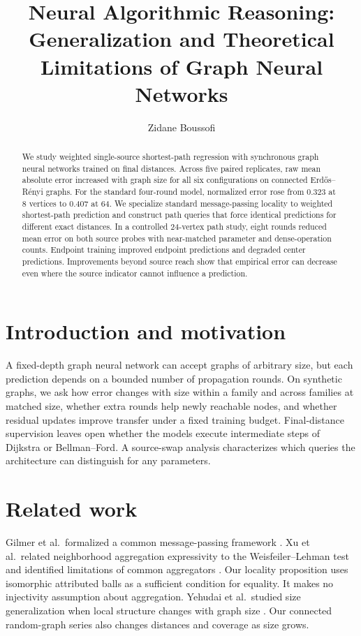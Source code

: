 \documentclass[11pt]{article}
\title{Neural Algorithmic Reasoning:\\ Generalization and Theoretical Limitations of Graph Neural Networks}
\author{Zidane Boussofi}
\date{}
\begin{document}
\maketitle
\begin{abstract}
We study weighted single-source shortest-path regression with synchronous graph neural networks trained on final distances. Across five paired replicates, raw mean absolute error increased with graph size for all six configurations on connected Erd\H{o}s--R\'enyi graphs. For the standard four-round model, normalized error rose from 0.323 at 8 vertices to 0.407 at 64. We specialize standard message-passing locality to weighted shortest-path prediction and construct path queries that force identical predictions for different exact distances. In a controlled 24-vertex path study, eight rounds reduced mean error on both source probes with near-matched parameter and dense-operation counts. Endpoint training improved endpoint predictions and degraded center predictions. Improvements beyond source reach show that empirical error can decrease even where the source indicator cannot influence a prediction.
\end{abstract}

\section{Introduction and motivation}
A fixed-depth graph neural network can accept graphs of arbitrary size, but each prediction depends on a bounded number of propagation rounds. On synthetic graphs, we ask how error changes with size within a family and across families at matched size, whether extra rounds help newly reachable nodes, and whether residual updates improve transfer under a fixed training budget. Final-distance supervision leaves open whether the models execute intermediate steps of Dijkstra or Bellman--Ford. A source-swap analysis characterizes which queries the architecture can distinguish for any parameters.

\section{Related work}
Gilmer et al.\ formalized a common message-passing framework \cite{gilmer}. Xu et al.\ related neighborhood aggregation expressivity to the Weisfeiler--Lehman test and identified limitations of common aggregators \cite{xu}. Our locality proposition uses isomorphic attributed balls as a sufficient condition for equality. It makes no injectivity assumption about aggregation. Yehudai et al.\ studied size generalization when local structure changes with graph size \cite{yehudai}. Our connected random-graph series also changes distances and coverage as size grows.
\end{document}
